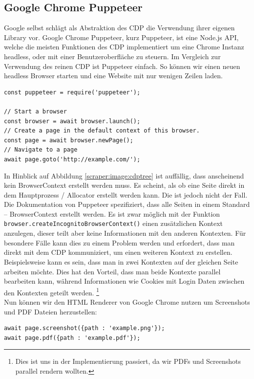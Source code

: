 \subsection*{Google Chrome Puppeteer} \label{scraper:subsec:puppeteer}
Google selbst schlägt als Abstraktion des \ac{CDP} die Verwendung ihrer eigenen Library vor. Google Chrome Puppeteer, kurz Puppeteer, ist eine Node.js API, welche die meisten Funktionen des \ac{CDP} implementiert um eine Chrome Instanz headless, oder mit einer Benutzeroberfläche zu steuern. \cite{https://pptr.dev/} Im Vergleich zur Verwendung des reinen \ac{CDP} ist Puppeteer einfach. So können wir einen neuen headless Browser starten und eine Website mit nur wenigen Zeilen laden.
\begin{verbatim}
const puppeteer = require('puppeteer');

// Start a browser
const browser = await browser.launch(); 
// Create a page in the default context of this browser.
const page = await browser.newPage();  
// Navigate to a page
await page.goto('http://example.com/'); 
\end{verbatim}
In Hinblick auf Abbildung \ref{scraper:image:cdptree} ist auffällig, dass anscheinend kein BrowserContext erstellt werden muss. Es scheint, als ob eine Seite direkt in dem Hauptprozess / Allocator erstellt werden kann. Die ist jedoch nicht der Fall. Die Dokumentation von Puppeteer spezifiziert, dass alle Seiten in einem Standard – BrowserContext erstellt werden. Es ist zwar möglich mit der Funktion \texttt{browser.createIncognitoBrowserContext()} einen zusätzlichen Kontext anzulegen, dieser teilt aber keine Informationen mit den anderen Kontexten. Für besondere Fälle kann dies zu einem Problem werden und erfordert, dass man direkt mit dem CDP kommuniziert, um einen weiteren Kontext zu erstellen. Beispielsweise kann es sein, dass man in zwei Kontexten auf der gleichen Seite arbeiten möchte. Dies hat den Vorteil, dass man beide Kontexte parallel bearbeiten kann, während Informationen wie Cookies mit Login Daten zwischen den Kontexten geteilt werden. \footnote{Dies ist uns in der Implementierung passiert, da wir PDFs und Screenshots parallel rendern wollten.} \\
Nun können wir den HTML Renderer von Google Chrome nutzen um Screenshots und PDF Dateien herzustellen:  
\begin{verbatim}
await page.screenshot({path : 'example.png'});
await page.pdf({path : 'example.pdf'});
\end{verbatim}